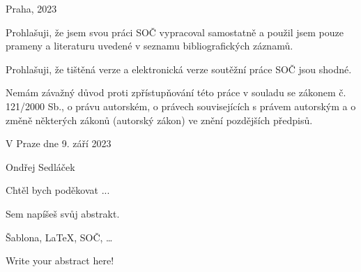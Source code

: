 \documentclass[12pt, a4paper,
 twoside,        %
 openright
]{report}
\newcommand\city{Praha} %
\newcommand\authorName{Ondřej Sedláček}  %
\newcommand\publicationYear{2023} %
\begin{document}
\noindent \city, \publicationYear
\cleardoublepage


\noindent Prohlašuji, že jsem svou práci SOČ vypracoval samostatně a použil jsem pouze prameny a literaturu uvedené v seznamu bibliografických záznamů.

\noindent Prohlašuji, že tištěná verze a elektronická verze soutěžní práce SOČ jsou shodné.

\noindent Nemám závažný důvod proti zpřístupňování této práce v souladu se zákonem č. 121/2000 Sb., o právu autorském, o právech souvisejících s právem autorským a o změně některých zákonů (autorský zákon) ve znění pozdějších předpisů.

\vspace{24 pt}

\noindent V Praze dne 9. září 2023 \dotfill{}

\hspace{6cm} \authorName
\cleardoublepage

\vspace*{0.0\textheight}

\noindent
Chtěl bych poděkovat ...
\cleardoublepage


\noindent Sem napíšeš svůj abstrakt. \lipsum[1] %

\vspace{18pt}


\noindent Šablona, \LaTeX, SOČ, \dots

\vspace{18pt}


\noindent Write your abstract here! \lipsum[1] %

\vspace{18pt}
\end{document}
